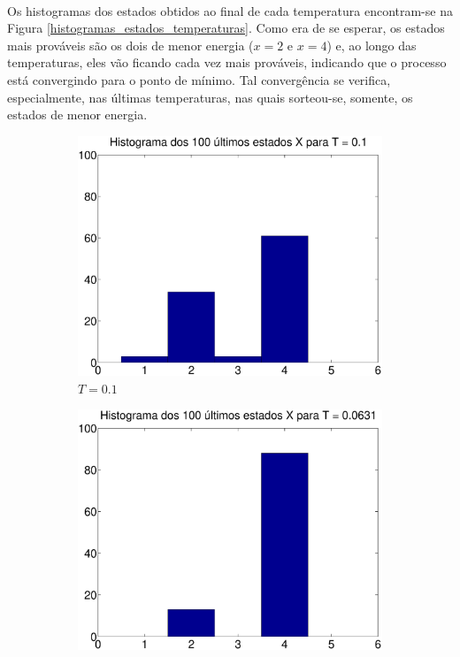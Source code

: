 \documentclass{report}
\begin{document}
\paragraph{} Os histogramas dos estados obtidos ao final de cada temperatura encontram-se na Figura \ref{histogramas_estados_temperaturas}. Como era de se esperar, os estados mais prováveis são os dois de menor energia ($x = 2$ e $x = 4$) e, ao longo das temperaturas, eles vão ficando cada vez mais prováveis, indicando que o processo está convergindo para o ponto de mínimo. Tal convergência se verifica, especialmente, nas últimas temperaturas, nas quais sorteou-se, somente, os estados de menor energia.\\

\begin{figure}
	\centering
	\begin{subfigure}{0.32\textwidth}
		\centering
		\includegraphics[width = \textwidth]{Q2_e_histograma_x_t_1}
		\caption{$T = 0.1$}
	\end{subfigure}
		\begin{subfigure}{0.32\textwidth}
		\centering
		\includegraphics[width = \textwidth]{Q2_e_histograma_x_t_2}

\end{subfigure}
\end{figure}
\end{document}
